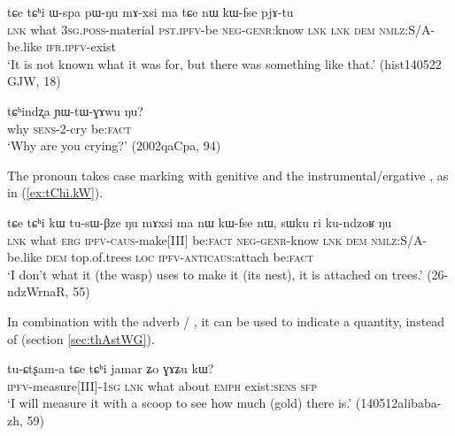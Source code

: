 \begin{exe}
\ex \label{ex:tChi.Wspa.pWNu}
\gll tɕe tɕʰi ɯ-spa pɯ-ŋu mɤ-xsi ma tɕe nɯ kɯ-fse pjɤ-tu  \\
\textsc{lnk} what \textsc{3sg.poss}-material \textsc{pst.ipfv}-be \textsc{neg-genr}:know \textsc{lnk} \textsc{lnk} \textsc{dem} \textsc{nmlz}:S/A-be.like \textsc{ifr.ipfv}-exist \\
\glt `It is not known what it was for, but there was something like that.' (hist140522 GJW, 18)
\end{exe}  

\begin{exe}
\ex \label{ex:tChi.YWtWɣAwu}
\gll tɕʰindʐa ɲɯ-tɯ-ɣɤwu ŋu? \\
why \textsc{sens}-2-cry be:\textsc{fact} \\
\glt `Why are you crying?' (2002qaCpa, 94)
\end{exe} 

The pronoun  takes case marking with genitive  and the instrumental/ergative , as in (\ref{ex:tChi.kW}).

\begin{exe}
\ex \label{ex:tChi.kW}
\gll tɕe tɕʰi kɯ tu-sɯ-βze ŋu mɤxsi ma nɯ kɯ-fse nɯ, sɯku ri ku-ndzoʁ ŋu \\
\textsc{lnk} what \textsc{erg} \textsc{ipfv}-\textsc{caus}-make[III] be:\textsc{fact} \textsc{neg}-\textsc{genr}-know \textsc{lnk} \textsc{dem} \textsc{nmlz}:S/A-be.like \textsc{dem} top.of.trees \textsc{loc} \textsc{ipfv}-\textsc{anticaus}:attach be:\textsc{fact} \\
\glt `I don't what it (the wasp) uses to make it (its nest), it is attached on trees.' (26-ndzWrnaR, 55)
\end{exe} 
In combination with the adverb  / , it can be used to indicate a quantity, instead of  (section \ref{sec:thAstWG}).

\begin{exe}
\ex \label{ex:tChi.jamar}
\gll tu-ɕtʂam-a tɕe tɕʰi jamar ʑo ɣɤʑu kɯ? \\
\textsc{ipfv}-measure[III]-\textsc{1sg} \textsc{lnk} what about \textsc{emph} exist:\textsc{sens} \textsc{sfp} \\
\glt `I will measure it with a scoop to see how much (gold) there is.' (140512alibaba-zh, 59)
\end{exe}  

